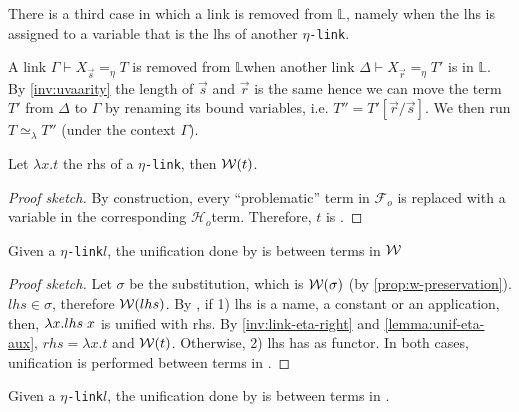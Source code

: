 \documentclass[sigconf,natbib=false,review]{acmart}
\newcommand{\appsep}{\ensuremath{\textcolor{lightgray}{\cdot}}}
\newcommand{\UnifRel}{\ensuremath{\simeq}}
\newcommand{\Ue}{\ensuremath{\UnifRel_\lambda}\xspace}
\newcommand{\linkMacro}[1]{\ensuremath{#1}\texttt{-link}\xspace}
\newcommand{\linketa} {\linkMacro{\eta}}
\newcommand{\Fo}{\texorpdfstring{\ensuremath{\mathcal{F}_{\!o}\xspace}}{Fo}} %
\newcommand{\Ho}{\texorpdfstring{\ensuremath{\mathcal{H}_o}\xspace}{Ho}}
\newcommand{\linketaM}[3]{\ensuremath{#1 \vdash #2 =_\eta #3}}
\newcommand{\lhs}{lhs\xspace}
\newcommand{\rhs}{rhs\xspace}
\newcommand{\linkStore}{\texorpdfstring{\ensuremath{\mathbb{L}}\xspace}{L}}
\begin{document}
There is a third case in which a link is removed from \linkStore, namely
when the \lhs is assigned to a variable that is the \lhs of another
\linketa.

\newcommand{\progressetadedup}{\emph{$\eta$-progress-deduplicate}\xspace}
\begin{definition}[\progressetadedup]\label{def:progressetadedup}
  A link \linketaM{\Gamma}{X_{\vec{s}}}{T} is removed from \linkStore when
  another link \linketaM{\Delta}{X_{\vec{r}}}{T'} is in  \linkStore.
  By \cref{inv:uvaarity} the length of $\vec{s}$ and $\vec{r}$ is the same
  hence we can move the term $T'$ from $\Delta$ to $\Gamma$ by renaming its
  bound variables, i.e. $T'' = T'[\vec{r}/\vec{s}]$.
  We then run $T \Ue{} T''$ (under the context $\Gamma$).
\end{definition}

\begin{lemma}
  Let $\lambda x.t$ the \rhs of a \linketa, then $\mathcal{W}(t)$.
  \label{lemma:unif-eta-aux}
\end{lemma}

\begin{proof}[Proof sketch]
  By construction, every ``problematic'' term in \Fo{} is replaced with a variable
  in the corresponding \Ho term. Therefore, $t$ is \wellb.
\end{proof}

\begin{lemma}
  Given a \linketa $l$, the unification done by \progressetaleft is between
  terms in $\mathcal{W}$  
  \label{lemma:unif-eta-1}
\end{lemma}

\begin{proof}[Proof sketch]
  Let $\sigma$ be the substitution, which is  $\mathcal{W}(\sigma)$ (by
  \cref{prop:w-preservation}). $\lhs \in \sigma$, therefore $\wellb(\lhs)$. By
  \progressetaleft, if 1) \lhs is a name, a constant or an
  application, then, $\lambda x.\lhs \appsep x$ is unified with \rhs. By
  \cref{inv:link-eta-right} and \cref{lemma:unif-eta-aux}, $\rhs = \lambda x. t$ and $\mathcal{W}(t)$.
  Otherwise, 2) \lhs has  as functor. In both cases, unification is
  performed between terms in \wellb.
\end{proof}

\begin{lemma}
  Given a \linketa $l$, the unification done by \progressetaright is between
  terms in \wellb.
  \label{lemma:unif-eta-2}
\end{lemma}
\end{document}
